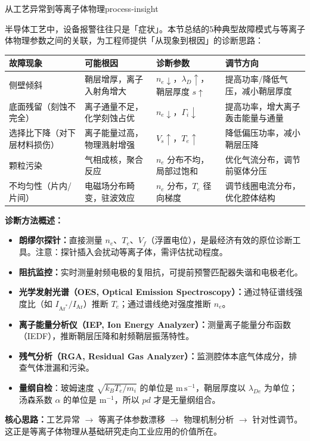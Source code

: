 \documentclass[12pt,a4paper,openany,oneside]{book}
\begin{document}
\begin{insight}{从工艺异常到等离子体物理}{process-insight}

半导体工艺中，设备报警往往只是「症状」。本节总结的5种典型故障模式与等离子体物理参数之间的关联，为工程师提供「从现象到根因」的诊断思路：

\begin{center}
\small
\setlength{\tabcolsep}{4pt}
\begin{tabular}{@{}p{3.2cm}p{3.5cm}p{3.5cm}p{3.5cm}@{}}
\toprule
\textbf{故障现象} & \textbf{可能根因} & \textbf{诊断参数} & \textbf{调节方向} \\
\midrule
侧壁倾斜 & 鞘层增厚，离子入射角增大 & $n_e \downarrow$，$\lambda_D \uparrow$，鞘层厚度 $s \uparrow$ & 提高功率/降低气压，减小鞘层厚度 \\
底面残留（刻蚀不完全） & 离子通量不足，化学刻蚀占优 & $n_e \downarrow$，$\Gamma_i \downarrow$ & 提高功率，增大离子轰击能量与通量 \\
选择比下降（对下层材料损伤） & 离子能量过高，物理溅射增强 & $V_s \uparrow$，$T_e \uparrow$ & 降低偏压功率，减小鞘层压降 \\
颗粒污染 & 气相成核，聚合反应 & $n_e$ 分布不均，局部过饱和 & 优化气流分布，调节前驱体分压 \\
不均匀性（片内/片间） & 电磁场分布畸变，驻波效应 & $n_e$ 分布，$T_e$ 径向梯度 & 调节线圈电流分布，优化腔体结构 \\
\bottomrule
\end{tabular}
\end{center}

\textbf{诊断方法概述：}

\begin{itemize}
    \item \textbf{朗缪尔探针：}直接测量 $n_e$、$T_e$、$V_f$（浮置电位），是最经济有效的原位诊断工具。注意：探针插入会扰动等离子体，需评估扰动程度。
    \item \textbf{阻抗监控：}实时测量射频电极的复阻抗，可提前预警匹配器失谐和电极老化。
    \item \textbf{光学发射光谱（OES, Optical Emission Spectroscopy）：}通过特征谱线强度比（如 $I_{\text{Ar}^{*}}/I_{\text{Ar}}$）推断 $T_e$；通过谱线绝对强度推断 $n_e$。
    \item \textbf{离子能量分析仪（IEP, Ion Energy Analyzer）：}测量离子能量分布函数（IEDF），推断鞘层压降和射频鞘层振荡特性。
    \item \textbf{残气分析（RGA, Residual Gas Analyzer）：}监测腔体本底气体成分，排查气体泄漏和污染。
\item \textbf{量纲自检}：玻姆速度 $\sqrt{k_BT_e/m_i}$ 的单位是 $\mathrm{m\,s^{-1}}$，鞘层厚度以 $\lambda_{De}$ 为单位；汤森系数 $\alpha$ 的单位是 $\mathrm{m^{-1}}$，所以 $pd$ 才是无量纲组合。
\end{itemize}

\textbf{核心思路：}工艺异常 $\rightarrow$ 等离子体参数漂移 $\rightarrow$ 物理机制分析 $\rightarrow$ 针对性调节。这正是等离子体物理从基础研究走向工业应用的价值所在。
\end{insight}
\end{document}
